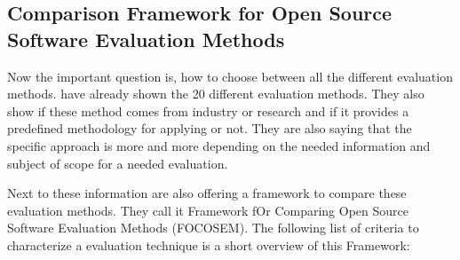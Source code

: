 \documentclass[DIV=calc,paper=a4,fontsize=9pt,twocolumn]{scrartcl}
\begin{document}
\subsection{Comparison Framework for Open Source Software Evaluation Methods}

Now the important question is, how to choose between all the different evaluation methods. \citet{stol2010comparison} have already shown the 20 different evaluation methods. They also show if these method comes from industry or research and if it provides a predefined methodology for applying or not. They are also saying that the specific approach is more and more depending on the needed information and subject of scope for a needed evaluation.

Next to these information \citet{stol2010comparison} are also offering a framework to compare these evaluation methods. They call it Framework fOr Comparing Open Source Software Evaluation Methods (FOCOSEM). The following list of criteria to characterize a evaluation technique is a short overview of this Framework:
\end{document}
